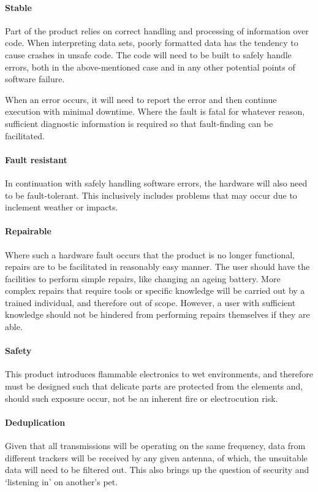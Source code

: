 \paragraph{Stable}
Part of the product relies on correct handling and processing of 
information over code. When interpreting data sets, poorly formatted 
data has the tendency to cause crashes in unsafe code. 
The code will need to be built to safely handle errors, both in the 
above-mentioned case and in any other potential points of 
software failure. 

When an error occurs, it will need to report the error and then 
continue execution with minimal downtime. Where the fault is fatal for whatever reason, 
sufficient diagnostic information is required so that fault-finding 
can be facilitated. 

\paragraph{Fault resistant}
In continuation with safely handling software errors, the 
hardware will also need to be fault-tolerant. This 
inclusively includes problems 
that may occur due to inclement weather or impacts.

\paragraph{Repairable}
Where such a hardware fault occurs that the product is no longer 
functional, repairs are to be facilitated in reasonably easy manner. 
The user should have the facilities to perform simple repairs, like 
changing an ageing battery. 
More complex repairs that require tools or specific knowledge
will be carried out by a trained individual, and therefore out of 
scope. However, a user with sufficient knowledge should not 
be hindered from performing repairs themselves if they are able. 

\paragraph{Safety}
This product introduces flammable electronics to wet environments, 
and therefore must be designed such that delicate parts are protected 
from the elements and, should such exposure occur, not be an 
inherent fire or electrocution risk.

\paragraph{Deduplication}\label{sec:dedupe}
Given that all transmissions will be operating on the same frequency, 
data from different trackers will be received by any given antenna, 
of which, the unsuitable data will need to be filtered out.  
This also brings up the question of security and `listening in' on 
another's pet. 

